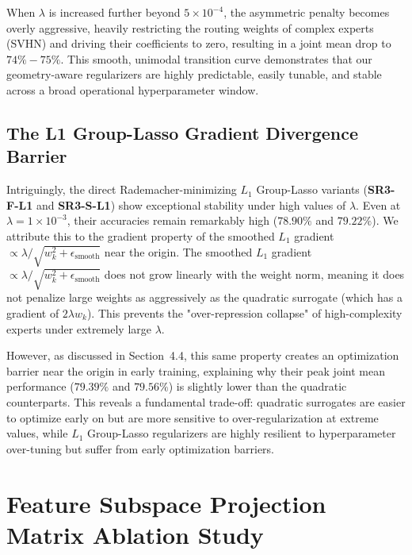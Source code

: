 \documentclass{article}
\theoremstyle{plain}
\theoremstyle{definition}
\theoremstyle{remark}
\begin{document}
When $\lambda$ is increased further beyond $5\times 10^{-4}$, the asymmetric penalty becomes overly aggressive, heavily restricting the routing weights of complex experts (SVHN) and driving their coefficients to zero, resulting in a joint mean drop to $74\% - 75\%$. This smooth, unimodal transition curve demonstrates that our geometry-aware regularizers are highly predictable, easily tunable, and stable across a broad operational hyperparameter window.

\subsection{The L1 Group-Lasso Gradient Divergence Barrier}
Intriguingly, the direct Rademacher-minimizing $L_1$ Group-Lasso variants (\textbf{SR3-F-L1} and \textbf{SR3-S-L1}) show exceptional stability under high values of $\lambda$. Even at $\lambda = 1\times 10^{-3}$, their accuracies remain remarkably high ($78.90\%$ and $79.22\%$). We attribute this to the gradient property of the smoothed $L_1$ gradient $\propto \lambda / \sqrt{w_k^2 + \epsilon_{\text{smooth}}}$ near the origin. The smoothed $L_1$ gradient $\propto \lambda / \sqrt{w_k^2 + \epsilon_{\text{smooth}}}$ does not grow linearly with the weight norm, meaning it does not penalize large weights as aggressively as the quadratic surrogate (which has a gradient of $2 \lambda w_k$). This prevents the "over-repression collapse" of high-complexity experts under extremely large $\lambda$. 

However, as discussed in Section~4.4, this same property creates an optimization barrier near the origin in early training, explaining why their peak joint mean performance ($79.39\%$ and $79.56\%$) is slightly lower than the quadratic counterparts. This reveals a fundamental trade-off: quadratic surrogates are easier to optimize early on but are more sensitive to over-regularization at extreme values, while $L_1$ Group-Lasso regularizers are highly resilient to hyperparameter over-tuning but suffer from early optimization barriers.

\section{Feature Subspace Projection Matrix Ablation Study}
\label{app:projection_ablations}
\end{document}
